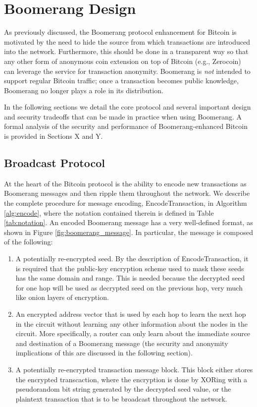 \section{Boomerang Design}

As previously discussed, the Boomerang protocol enhancement for Bitcoin is motivated by the need to hide the source from which transactions are introduced into the network. Furthermore, this should be done in a transparent way so that any other form of anonymous coin extension on top of Bitcoin (e.g., Zerocoin) can leverage the service for transaction anonymity. Boomerang is \emph{not} intended to support regular Bitcoin traffic; once a transaction becomes public knowledge, Boomerang no longer plays a role in its distribution. 

In the following sections we detail the core protocol and several important design and security tradeoffs that can be made in practice when using Boomerang. A formal analysis of the security and performance of Boomerang-enhanced Bitcoin is provided in Sections X and Y. 

\subsection{Broadcast Protocol}

At the heart of the Bitcoin protocol is the ability to encode new transactions as Boomerang messages and then ripple them throughout the network. We describe the complete procedure for message encoding, {\sf EncodeTransaction}, in Algorithm \ref{alg:encode}, where the notation contained therein is defined in Table \ref{tab:notation}. An encoded Boomerang message has a very well-defined format, as shown in Figure \ref{fig:boomerang_message}. In particular, the message is composed of the following:
\begin{enumerate}
	\item A potentially re-encrypted seed. By the description of {\sf EncodeTransaction}, it is required that the public-key encryption scheme used to mask these seeds has the same domain and range. This is needed because the decrypted seed for one hop will be used as decrypted seed on the previous hop, very much like onion layers of encryption.
	\item An encrypted address vector that is used by each hop to learn the next hop in the circuit without learning any other information about the nodes in the circuit. More specifically, a router can only learn about the immediate source and destination of a Boomerang message (the security and anonymity implications of this are discussed in the following section).
	\item A potentially re-encrypted transaction message block. This block either stores the encrypted transcaction, where the encryption is done by XORing with a pseudorandom bit string generated by the decrypted seed value, or the plaintext transaction that is to be broadcast throughout the network.
\end{enumerate}

